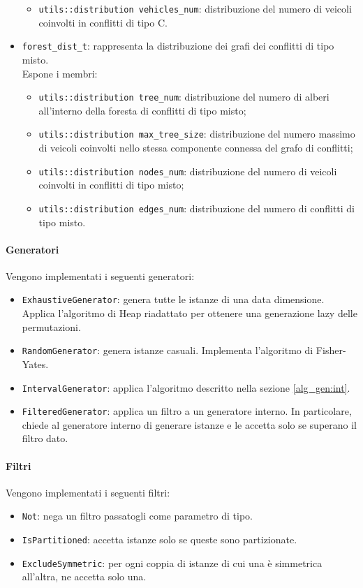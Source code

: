 \documentclass[../../../relazione.tex]{subfiles}
\begin{document}
\begin{itemize}
\begin{itemize}
              \item \texttt{utils::distribution vehicles\_num}: distribuzione del numero di veicoli coinvolti in conflitti di tipo C.
          \end{itemize}
    \item \texttt{forest\_dist\_t}: rappresenta la distribuzione dei grafi dei conflitti di tipo misto. \\
          Espone i membri:
          \begin{itemize}
              \item \texttt{utils::distribution tree\_num}: distribuzione del numero di alberi all'interno della foresta di conflitti di tipo misto;
              \item \texttt{utils::distribution max\_tree\_size}: distribuzione del numero massimo di veicoli coinvolti nello stessa componente connessa del grafo di conflitti;
              \item \texttt{utils::distribution nodes\_num}: distribuzione del numero di veicoli coinvolti in conflitti di tipo misto;
              \item \texttt{utils::distribution edges\_num}: distribuzione del numero di conflitti di tipo misto.
          \end{itemize}
\end{itemize}

\paragraph{Generatori}
Vengono implementati i seguenti generatori:
\begin{itemize}
    \item \texttt{ExhaustiveGenerator}: genera tutte le istanze di una data dimensione. Applica l'algoritmo di Heap riadattato per ottenere una generazione lazy delle permutazioni.
    \item \texttt{RandomGenerator}: genera istanze casuali. Implementa l'algoritmo di Fisher-Yates.
    \item \texttt{IntervalGenerator}: applica l'algoritmo descritto nella sezione \ref{alg_gen:int}.
    \item \texttt{FilteredGenerator}: applica un filtro a un generatore interno. In particolare, chiede al generatore interno di generare istanze e le accetta solo se superano il filtro dato.
\end{itemize}

\paragraph{Filtri}
Vengono implementati i seguenti filtri:
\begin{itemize}
    \item \texttt{Not}: nega un filtro passatogli come parametro di tipo.
    \item \texttt{IsPartitioned}: accetta istanze solo se queste sono partizionate.
    \item \texttt{ExcludeSymmetric}: per ogni coppia di istanze di cui una è simmetrica all'altra, ne accetta solo una.
\end{itemize}
\end{document}
